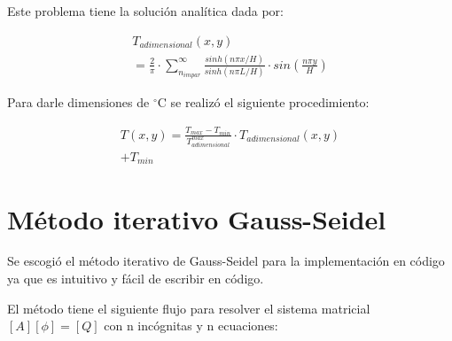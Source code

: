 \documentclass[article,latterpaper]{IEEEtran}
\begin{document}
Este problema tiene la solución analítica dada por:

\begin{multline}
    T_{adimensional}(x,y)\\
    =\frac{2}{\pi}\cdot\sum_{n_{impar}}^\infty\frac{sinh(n\pi x/H)}{sinh(n\pi L/H)}\cdot sin(\frac{n\pi y}{H})
    \label{Sol_An_Ad}
\end{multline}

Para darle dimensiones de $^{\circ}\mathrm{C}$ se realizó el siguiente procedimiento:

\begin{multline}
    T(x,y)=\frac{T_{max}-T_{min}}{T_{adimensional}^{max}}\cdot T_{adimensional}(x,y)\\
    + T_{min}
    \label{Sol_An}
\end{multline}

\section{Método iterativo Gauss-Seidel}

Se escogió el método iterativo de Gauss-Seidel para la implementación en código ya que es intuitivo y fácil de escribir en código.

El método tiene el siguiente flujo para resolver el sistema matricial $[A][\phi]=[Q]$ con n incógnitas y n ecuaciones:
\end{document}

